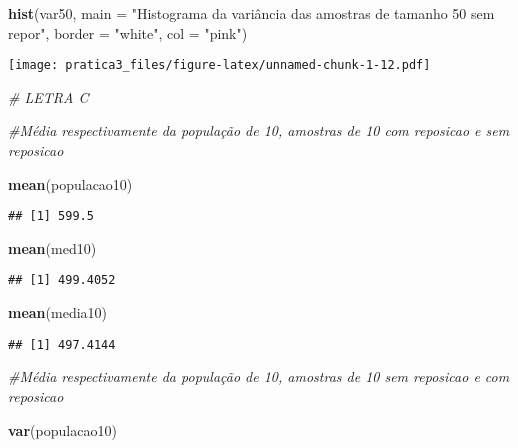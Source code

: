 \documentclass[]{article}
\newenvironment{Shaded}{\begin{snugshade}}{\end{snugshade}}
\newcommand{\KeywordTok}[1]{\textcolor[rgb]{0.13,0.29,0.53}{\textbf{#1}}}
\newcommand{\DataTypeTok}[1]{\textcolor[rgb]{0.13,0.29,0.53}{#1}}
\newcommand{\StringTok}[1]{\textcolor[rgb]{0.31,0.60,0.02}{#1}}
\newcommand{\CommentTok}[1]{\textcolor[rgb]{0.56,0.35,0.01}{\textit{#1}}}
\newcommand{\NormalTok}[1]{#1}
\begin{document}
\begin{Shaded}
\begin{Highlighting}[]
\KeywordTok{hist}\NormalTok{(var50, }\DataTypeTok{main =} \StringTok{"Histograma da variância das amostras de tamanho 50 sem repor"}\NormalTok{, }\DataTypeTok{border =} \StringTok{"white"}\NormalTok{, }\DataTypeTok{col =} \StringTok{"pink"}\NormalTok{)}
\end{Highlighting}
\end{Shaded}

\texttt{[image: pratica3\_files/figure-latex/unnamed-chunk-1-12.pdf]}

\begin{Shaded}
\begin{Highlighting}[]
\CommentTok{# LETRA C}

 \CommentTok{#Média respectivamente da população de 10, amostras de 10 com reposicao e sem reposicao}

\KeywordTok{mean}\NormalTok{(populacao10)}
\end{Highlighting}
\end{Shaded}

\begin{verbatim}
## [1] 599.5
\end{verbatim}

\begin{Shaded}
\begin{Highlighting}[]
\KeywordTok{mean}\NormalTok{(med10)}
\end{Highlighting}
\end{Shaded}

\begin{verbatim}
## [1] 499.4052
\end{verbatim}

\begin{Shaded}
\begin{Highlighting}[]
\KeywordTok{mean}\NormalTok{(media10)}
\end{Highlighting}
\end{Shaded}

\begin{verbatim}
## [1] 497.4144
\end{verbatim}

\begin{Shaded}
\begin{Highlighting}[]
 \CommentTok{#Média respectivamente da população de 10, amostras de 10 sem reposicao e com reposicao}

\KeywordTok{var}\NormalTok{(populacao10)}
\end{Highlighting}
\end{Shaded}
\end{document}
